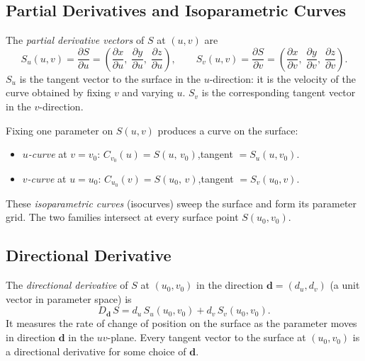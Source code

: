 \subsection{Partial Derivatives and Isoparametric Curves}

\begin{tcolorbox}[colback=propbox, colframe=propborder, arc=2pt,
  left=6pt, right=6pt, top=4pt, bottom=4pt,
  title={\small\textbf{Definition (Partial Derivative Vectors)}},
  fonttitle=\small\bfseries]
The \emph{partial derivative vectors} of $S$ at $(u,v)$ are
\[
  S_u(u,v) = \frac{\partial S}{\partial u}
  = \left(\frac{\partial x}{\partial u},\;
          \frac{\partial y}{\partial u},\;
          \frac{\partial z}{\partial u}\right),
  \qquad
  S_v(u,v) = \frac{\partial S}{\partial v}
  = \left(\frac{\partial x}{\partial v},\;
          \frac{\partial y}{\partial v},\;
          \frac{\partial z}{\partial v}\right).
\]
$S_u$ is the tangent vector to the surface in the $u$-direction:
it is the velocity of the curve obtained by fixing $v$ and varying $u$.
$S_v$ is the corresponding tangent vector in the $v$-direction.
\end{tcolorbox}

\begin{tcolorbox}[colback=propbox, colframe=propborder, arc=2pt,
  left=6pt, right=6pt, top=4pt, bottom=4pt,
  title={\small\textbf{Definition (Isoparametric Curves)}},
  fonttitle=\small\bfseries]
Fixing one parameter on $S(u,v)$ produces a curve on the surface:
\begin{itemize}
  \item \emph{$u$-curve} at $v = v_0$:\quad
        $C_{v_0}(u) = S(u,\,v_0)$,\quad tangent $= S_u(u,v_0)$.
  \item \emph{$v$-curve} at $u = u_0$:\quad
        $C_{u_0}(v) = S(u_0,\,v)$,\quad tangent $= S_v(u_0,v)$.
\end{itemize}
These \emph{isoparametric curves} (isocurves) sweep the surface and
form its parameter grid.
The two families intersect at every surface point $S(u_0,v_0)$.
\end{tcolorbox}

\subsection{Directional Derivative}

\begin{tcolorbox}[colback=propbox, colframe=propborder, arc=2pt,
  left=6pt, right=6pt, top=4pt, bottom=4pt,
  title={\small\textbf{Definition (Directional Derivative on a Surface)}},
  fonttitle=\small\bfseries]
The \emph{directional derivative} of $S$ at $(u_0,v_0)$ in the
direction $\mathbf{d} = (d_u, d_v)$ (a unit vector in parameter space) is
\[
  D_{\mathbf{d}}\,S = d_u\,S_u(u_0,v_0) + d_v\,S_v(u_0,v_0).
\]
It measures the rate of change of position on the surface as the
parameter moves in direction $\mathbf{d}$ in the $uv$-plane.
Every tangent vector to the surface at $(u_0,v_0)$ is a directional
derivative for some choice of $\mathbf{d}$.
\end{tcolorbox}

